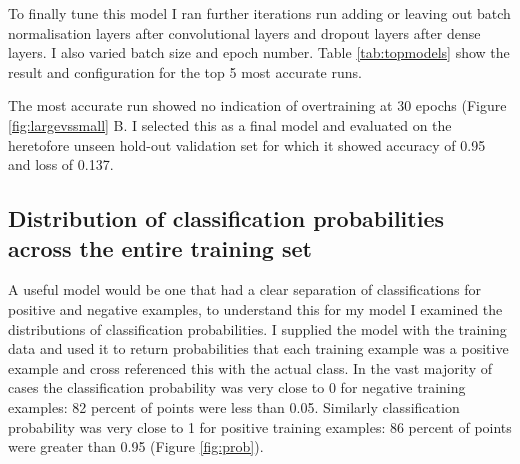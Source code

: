 \documentclass[12pt,a4paper,]{article}
\begin{document}
To finally tune this model I ran further iterations run adding or leaving out batch normalisation layers after convolutional layers and dropout layers after dense layers. I also varied batch size and epoch number. Table \ref{tab:topmodels} show the result and configuration for the top 5 most accurate runs.

\begin{table}[t]

\caption{\label{tab:topmodels}Top 5 runs of a small CNN network model with optional added batch normalisation and dropout layers showing configurations and values.}
\centering
{}
\end{table}

The most accurate run showed no indication of overtraining at 30 epochs (Figure \ref{fig:largevssmall} B. I selected this as a final model and evaluated on the heretofore unseen hold-out validation set for which it showed accuracy of 0.95 and loss of 0.137.

\hypertarget{distribution-of-classification-probabilities-across-the-entire-training-set}{%
\subsection{Distribution of classification probabilities across the entire training set}\label{distribution-of-classification-probabilities-across-the-entire-training-set}}

A useful model would be one that had a clear separation of classifications for positive and negative examples, to understand this for my model I examined the distributions of classification probabilities. I supplied the model with the training data and used it to return probabilities that each training example was a positive example and cross referenced this with the actual class. In the vast majority of cases the classification probability was very close to 0 for negative training examples: 82 percent of points were less than 0.05. Similarly classification probability was very close to 1 for positive training examples: 86 percent of points were greater than 0.95 (Figure \ref{fig:prob}).
\end{document}
